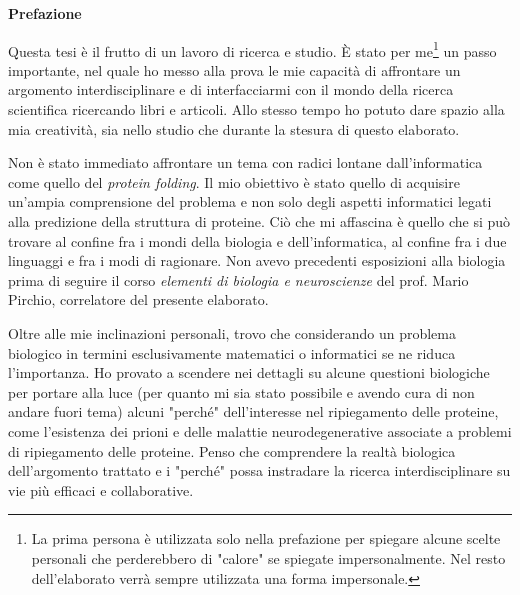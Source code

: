 
\textbf{\LARGE Prefazione}\newline\newline

Questa tesi è il frutto di un lavoro di ricerca e studio. È stato per me\footnote{La prima persona è utilizzata solo nella prefazione per spiegare alcune scelte personali che perderebbero di "calore" se spiegate impersonalmente. Nel resto dell'elaborato verrà sempre utilizzata una forma impersonale.} un passo importante, nel quale ho messo alla prova le mie capacità di affrontare un argomento interdisciplinare e di interfacciarmi con il mondo della ricerca scientifica ricercando libri e articoli. Allo stesso tempo ho potuto dare spazio alla mia creatività, sia nello studio che durante la stesura di questo elaborato. \\

\par Non è stato immediato affrontare un tema con radici lontane dall'informatica come quello del \textit{protein folding}. Il mio obiettivo è stato quello di acquisire un'ampia comprensione del problema e non solo degli aspetti informatici legati alla predizione della struttura di proteine. Ciò che mi affascina è quello che si può trovare al confine fra i mondi della biologia e dell'informatica, al confine fra i due linguaggi e fra i modi di ragionare. Non avevo precedenti esposizioni alla biologia prima di seguire il corso \textit{elementi di biologia e neuroscienze} del prof. Mario Pirchio, correlatore del presente elaborato. \\

\par Oltre alle mie inclinazioni personali, trovo che considerando un problema biologico in termini esclusivamente matematici o informatici se ne riduca l'importanza. Ho provato a scendere nei dettagli su alcune questioni biologiche per portare alla luce (per quanto mi sia stato possibile e avendo cura di non andare fuori tema) alcuni "perché" dell'interesse nel ripiegamento delle proteine, come l'esistenza dei prioni e delle malattie neurodegenerative associate a problemi di ripiegamento delle proteine. Penso che comprendere la realtà biologica dell'argomento trattato e i "perché" possa instradare la ricerca interdisciplinare su vie più efficaci e collaborative.


\clearpage

